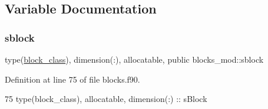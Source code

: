 \subsection{Variable Documentation}
\mbox{\label{namespaceblocks__mod_a13b3fc755dfbf3e333490a3f931b28aa}} 
\subsubsection{\texorpdfstring{sblock}{sblock}}
{\footnotesize\ttfamily type(\mbox{\hyperlink{structblocks__mod_1_1block__class}{block\+\_\+class}}), dimension(\+:), allocatable, public blocks\+\_\+mod\+::sblock}



Definition at line 75 of file blocks.\+f90.


\begin{DoxyCode}
75     \textcolor{keywordtype}{type}(block\_class), \textcolor{keywordtype}{allocatable}, \textcolor{keywordtype}{dimension(:)} :: sBlock
\end{DoxyCode}
